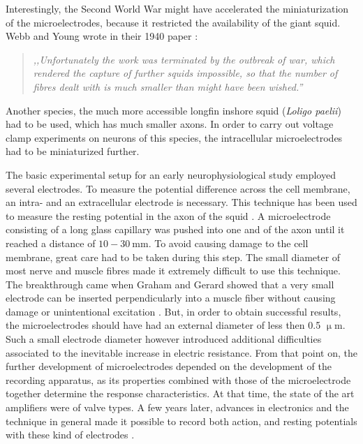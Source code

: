 Interestingly, the Second World War might have accelerated the miniaturization of the microelectrodes, because it restricted the availability of the giant squid.
Webb and Young wrote in their 1940 paper \cite{webb1940electrolyte}:

\begin{quote}
\vspace{0.5cm}
\emph{,,Unfortunately the work was terminated by the outbreak of war, which rendered the capture of further squids impossible, so that the number of fibres dealt with is much smaller than might have been wished.''}
\vspace{0.5cm}
\end{quote} 

Another species, the much more accessible longfin inshore squid (\emph{Loligo paelii}) had to be used, which has much smaller axons.
In order to carry out voltage clamp experiments on neurons of this species, the intracellular microelectrodes had to be miniaturized further.

The basic experimental setup for an early neurophysiological study employed several electrodes.
To measure the potential difference across the cell membrane, an intra- and an extracellular electrode is necessary.
This technique has been used to measure the resting potential in the axon of the squid \cite{curtis1940membrane, curtis1942membrane}.
A microelectrode consisting of a long glass capillary was pushed into one and of the axon until it reached a distance of $10-30~$mm.
To avoid causing damage to the cell membrane, great care had to be taken during this step.
The small diameter of most nerve and muscle fibres made it extremely difficult to use this technique.
The breakthrough came when Graham and Gerard showed that a very small electrode can be inserted perpendicularly into a muscle fiber without causing damage or unintentional excitation \cite{graham1946judith, ling1949normal}.
But, in order to obtain successful results, the microelectrodes should have had an external diameter of less then 0.5 $\upmu$m.
Such a small electrode diameter however introduced additional difficulties associated to the inevitable increase in electric resistance.
From that point on, the further development of microelectrodes depended on the development of the recording apparatus, as its properties combined with those of the microelectrode together determine the response characteristics.
At that time, the state of the art amplifiers were of valve types.
A few years later, advances in electronics and the technique in general made it possible to record both action, and resting potentials with these kind of electrodes \cite{hodgkin1949membrane, nastuk1950electrical}.

